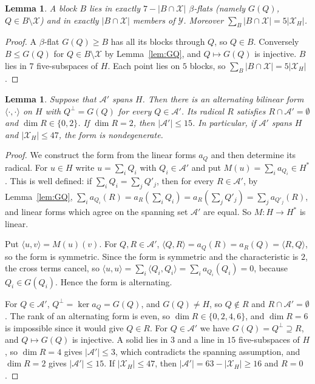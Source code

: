 \documentclass[11pt]{amsart}
\newtheorem{lemma}[theorem]{Lemma}
\theoremstyle{definition}
\newcommand{\X}{\mathcal{X}}
\newcommand{\Y}{\mathcal{Y}}
\newcommand{\A}{\mathcal{A}}
\begin{document}
\begin{lemma}\label{lem:blocksid}
A block $B$ lies in exactly $7-|B\cap\X|$ $\beta$-flats \textup{(}namely $G(Q)$, $Q\in B\setminus\X$\textup{)} and in exactly $|B\cap\X|$ members of $\Y$. Moreover $\sum_B|B\cap\X|=5|\X_H|$.
\end{lemma}
\begin{proof}
A $\beta$-flat $G(Q)\ge B$ has all its blocks through $Q$, so $Q\in B$. Conversely $B\le G(Q)$ for $Q\in B\setminus\X$ by Lemma~\ref{lem:GQ}, and $Q\mapsto G(Q)$ is injective. $B$ lies in $7$ five-subspaces of $H$. Each point lies on $5$ blocks, so $\sum_B|B\cap\X|=5|\X_H|$.
\end{proof}

\begin{lemma}\label{lem:polspan}
Suppose that $\A'$ spans $H$. Then there is an alternating bilinear form $\langle\cdot,\cdot\rangle$ on $H$ with $Q^\perp=G(Q)$ for every $Q\in\A'$. Its radical $R$ satisfies $R\cap\A'=\emptyset$ and $\dim R\in\{0,2\}$. If $\dim R=2$, then $|\A'|\le15$. In particular, if $\A'$ spans $H$ and $|\X_H|\le47$, the form is nondegenerate.
\end{lemma}
\begin{proof}
We construct the form from the linear forms $a_Q$ and then determine its radical. For $u\in H$ write $u=\sum_iQ_i$ with $Q_i\in\A'$ and put $M(u)=\sum_ia_{Q_i}\in H^*$. This is well defined: if $\sum_iQ_i=\sum_jQ'_j$, then for every $R\in\A'$, by Lemma~\ref{lem:GQ}, $\sum_ia_{Q_i}(R)=a_R(\sum_iQ_i)=a_R(\sum_jQ'_j)=\sum_ja_{Q'_j}(R)$, and linear forms which agree on the spanning set $\A'$ are equal. So $M:H\to H^*$ is linear.

Put $\langle u,v\rangle=M(u)(v)$. For $Q,R\in\A'$, $\langle Q,R\rangle=a_Q(R)=a_R(Q)=\langle R,Q\rangle$, so the form is symmetric. Since the form is symmetric and the characteristic is $2$, the cross terms cancel, so $\langle u,u\rangle=\sum_i\langle Q_i,Q_i\rangle=\sum_ia_{Q_i}(Q_i)=0$, because $Q_i\in G(Q_i)$. Hence the form is alternating. 

For $Q\in\A'$, $Q^\perp=\ker a_Q=G(Q)$, and $G(Q)\ne H$, so $Q\notin R$ and $R\cap\A'=\emptyset$. The rank of an alternating form is even, so $\dim R\in\{0,2,4,6\}$, and $\dim R=6$ is impossible since it would give $Q\in R$. For $Q\in\A'$ we have $G(Q)=Q^\perp\supseteq R$, and $Q\mapsto G(Q)$ is injective. A solid lies in $3$ and a line in $15$ five-subspaces of $H$, so $\dim R=4$ gives $|\A'|\le3$, which contradicts the spanning assumption, and $\dim R=2$ gives $|\A'|\le15$. If $|\X_H|\le47$, then $|\A'|=63-|\X_H|\ge16$ and $R=0$.
\end{proof}
\end{document}
